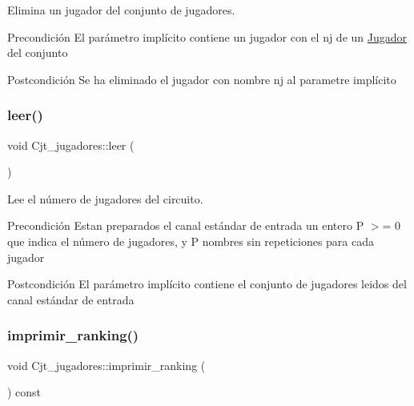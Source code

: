 Elimina un jugador del conjunto de jugadores. 

\begin{DoxyPrecond}{Precondición}
El parámetro implícito contiene un jugador con el nj de un \hyperlink{class_jugador}{Jugador} del conjunto 
\end{DoxyPrecond}
\begin{DoxyPostcond}{Postcondición}
Se ha eliminado el jugador con nombre nj al parametre implícito 
\end{DoxyPostcond}
\mbox{\label{class_cjt__jugadores_a625e1ba48fc2f9b7c868820e1dc417f1}} 
\subsubsection{\texorpdfstring{leer()}{leer()}}
{\footnotesize\ttfamily void Cjt\+\_\+jugadores\+::leer (\begin{DoxyParamCaption}{ }\end{DoxyParamCaption})}



Lee el número de jugadores del circuito. 

\begin{DoxyPrecond}{Precondición}
Estan preparados el canal estándar de entrada un entero P $>$= 0 que indica el número de jugadores, y P nombres sin repeticiones para cada jugador 
\end{DoxyPrecond}
\begin{DoxyPostcond}{Postcondición}
El parámetro implícito contiene el conjunto de jugadores leidos del canal estándar de entrada 
\end{DoxyPostcond}
\mbox{\label{class_cjt__jugadores_a2eca08ea3674049547e6eb6242da1df5}} 
\subsubsection{\texorpdfstring{imprimir\+\_\+ranking()}{imprimir\_ranking()}}
{\footnotesize\ttfamily void Cjt\+\_\+jugadores\+::imprimir\+\_\+ranking (\begin{DoxyParamCaption}{ }\end{DoxyParamCaption}) const}



